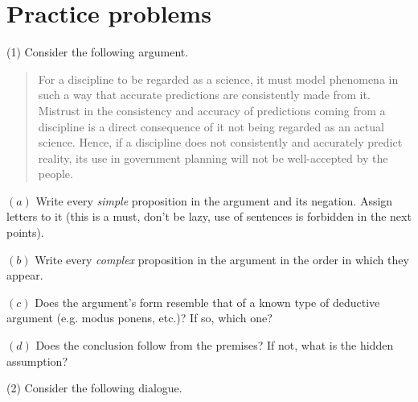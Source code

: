 \documentclass[a4paper, 12pt]{article}
\begin{document}
\pagebreak 

\section{Practice problems}

(1) Consider the following argument.

\begin{quote}
For a discipline to be regarded as a science, it must model phenomena in such a
way that accurate predictions are consistently made from it. Mistrust in
the consistency and accuracy of predictions coming from a discipline is a
direct consequence of it not being regarded as an actual science. Hence,
if a discipline does not consistently and accurately predict reality, its use
in government planning will not be well-accepted by the people.
\end{quote}

$(a)$ Write every \textit{simple} proposition in the argument and its negation.
Assign letters to it (this is a must, don't be lazy, use of sentences is
forbidden in the next points).

$(b)$ Write every \textit{complex} proposition in the argument in the order in which 
they appear.

$(c)$ Does the argument's form resemble that of a known type of deductive
argument (e.g. modus ponens, etc.)? If so, which one?

$(d)$ Does the conclusion follow from the premises? If not, what is the hidden
assumption?

\pagebreak

(2) Consider the following dialogue.
\end{document}
